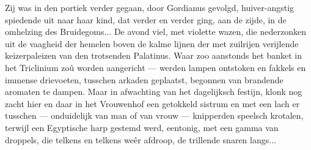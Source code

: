\documentclass[a4paper, 12pt, oneside, dutch]{article}
\begin{document}
Zij was in den portiek verder gegaan, door Gordianus gevolgd, huiver-angstig spiedende uit naar haar kind, dat verder en verder ging, aan de zijde, in de omhelzing des Bruidegoms... De avond viel, met violette wazen, die nederzonken uit de vaagheid der hemelen boven de kalme lijnen der met zuilrijen verijlende keizerpaleizen van den trotsenden Palatinus. Waar zoo aanstonds het banket in het Triclinium zoû worden aangericht --- werden lampen ontstoken en fakkels en immense drievoeten, tusschen arkaden geplaatst, begonnen van brandende aromaten te dampen. Maar in afwachting van het dagelijksch festijn, klonk nog zacht hier en daar in het Vrouwenhof een getokkeld sistrum en met een lach er tusschen --- onduidelijk van man of van vrouw --- knipperden speelsch krotalen, terwijl een Egyptische harp gestemd werd, eentonig, met een gamma van droppels, die telkens en telkens weêr afdroop, de trillende snaren langs...

\subsection{}
\end{document}
